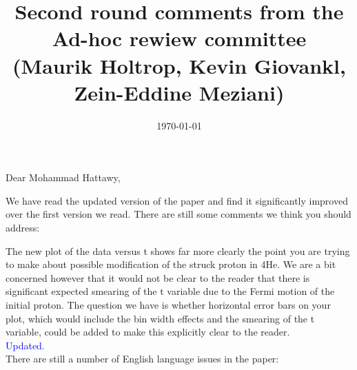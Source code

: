 \documentclass[a4paper,11pt,twoside]{article}
\title{Second round comments from the Ad-hoc rewiew committee \\
 (Maurik Holtrop, Kevin Giovankl, Zein-Eddine Meziani)}
\date{\today}
\begin{document}
\maketitle

\section*{}

Dear Mohammad Hattawy,

We have read the updated version of the paper and find it significantly 
improved over the first version we read. There are still some comments we think 
you should address:

The new plot of the data versus t shows far more clearly the point you are 
trying to make about possible modification of the struck proton in 4He. We are 
a bit concerned however that it would not be clear to the reader that there is 
significant expected smearing of the t variable due to the Fermi motion of the 
initial proton. The question we have is whether horizontal error bars on your 
plot, which would include the bin width effects and the smearing of the t 
variable, could be added to make this explicitly clear to the reader.\\
   \textcolor{blue}{Updated.}\\

There are still a number of English language issues in the paper:\\
\end{document}
